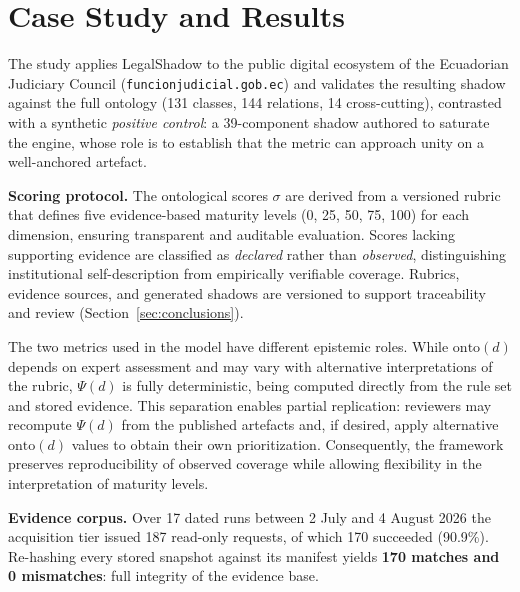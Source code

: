 \documentclass[engproc,proceedingpaper,submit,moreauthors]{Definitions/mdpi}
\begin{document}
\section{Case Study and Results}
\label{sec:results}
    The study applies LegalShadow to the public digital ecosystem of the Ecuadorian Judiciary Council (\texttt{funcionjudicial\-.gob\-.ec}) and validates the resulting shadow against the full ontology (131 classes, 144 relations, 14 cross-cutting), contrasted with a synthetic \emph{positive control}: a 39-component shadow authored to saturate the engine, whose role is to establish that the metric can approach unity on a well-anchored artefact.
    
    \textbf{Scoring protocol.} 
    The ontological scores $\sigma$ are derived from a versioned rubric that defines five evidence-based maturity levels (0, 25, 50, 75, 100) for each dimension, ensuring transparent and auditable evaluation. Scores lacking supporting evidence are classified as \emph{declared} rather than \emph{observed}, distinguishing institutional self-description from empirically verifiable coverage. Rubrics, evidence sources, and generated shadows are versioned to support traceability and review (Section~\ref{sec:conclusions}).

    The two metrics used in the model have different epistemic roles. While $\mathrm{onto}(d)$ depends on expert assessment and may vary with alternative interpretations of the rubric, $\Psi(d)$ is fully deterministic, being computed directly from the rule set and stored evidence. This separation enables partial replication: reviewers may recompute $\Psi(d)$ from the published artefacts and, if desired, apply alternative $\mathrm{onto}(d)$ values to obtain their own prioritization. Consequently, the framework preserves reproducibility of observed coverage while allowing flexibility in the interpretation of maturity levels.

    \textbf{Evidence corpus.} 
    Over 17 dated runs between 2 July and 4 August 2026 the acquisition tier issued 187 read-only requests, of which 170 succeeded (90.9\%). Re-hashing every stored snapshot against its manifest yields \textbf{170 matches and 0 mismatches}: full integrity of the evidence base.
    
\end{document}
